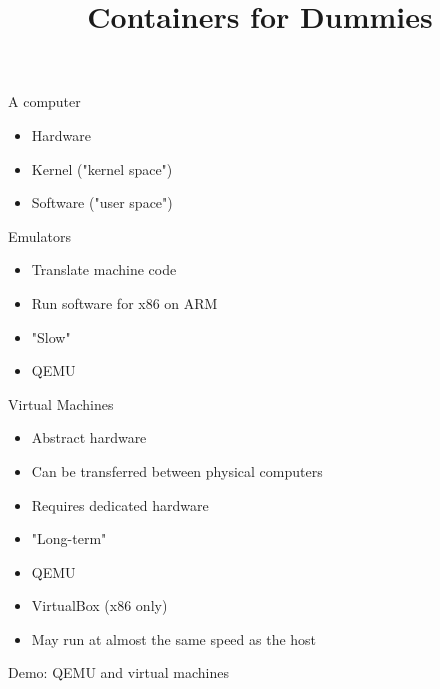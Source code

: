 \documentclass{dcpresentation}
\title{Containers for Dummies}
\author{}
\institute{SciLifeLab Data Centre}
\date{}
\begin{document}
 \begin{frame}
  \maketitle
 \end{frame}


 \begin{frame}{A computer}
  \begin{itemize}
   \item Hardware
   \item Kernel ("kernel space")
   \item Software ("user space")
  \end{itemize}
 \end{frame}

 \begin{frame}{Emulators}
  \begin{itemize}
   \item Translate machine code
   \item Run software for x86 on ARM
   \item "Slow"
   \item QEMU
  \end{itemize}
 \end{frame}
 
 \begin{frame}{Virtual Machines}
  \begin{itemize}
   \item Abstract hardware
   \item Can be transferred between physical computers
   \item Requires dedicated hardware
   \item "Long-term"
   \item QEMU
   \item VirtualBox (x86 only)
   \item May run at almost the same speed as the host
  \end{itemize}
 \end{frame}
  
 \begin{frame}
  \centering \alert{Demo: QEMU and virtual machines} 
 \end{frame}   
  
\end{document}
